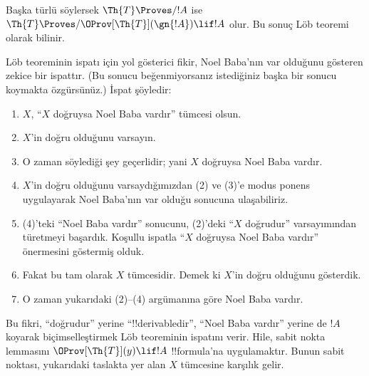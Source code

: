 Başka türlü söylersek $\Th{T} \Proves/ !A$ ise
$\Th{T} \Proves/ \OProv[\Th{T}](\gn{!A}) \lif !A$ olur. Bu sonuç L\"ob
teoremi olarak bilinir.

\begin{explain}
L\"ob teoreminin ispatı için yol gösterici fikir, Noel Baba'nın var olduğunu
gösteren zekice bir ispattır. (Bu sonucu beğenmiyorsanız istediğiniz başka bir
sonucu koymakta özgürsünüz.) İspat şöyledir:
\begin{enumerate}
\item $X$, ``$X$ doğruysa Noel Baba vardır'' tümcesi olsun.
\item $X$'in doğru olduğunu varsayın.
\item O zaman söylediği şey geçerlidir; yani $X$ doğruysa Noel Baba vardır.
\item $X$'in doğru olduğunu varsaydığımızdan (2) ve (3)'e modus ponens
  uygulayarak Noel Baba'nın var olduğu sonucuna ulaşabiliriz.
\item (4)'teki ``Noel Baba vardır'' sonucunu, (2)'deki ``$X$ doğrudur''
  varsayımından türetmeyi başardık. Koşullu ispatla ``$X$ doğruysa Noel Baba
  vardır'' önermesini göstermiş olduk.
\item Fakat bu tam olarak $X$ tümcesidir. Demek ki $X$'in doğru olduğunu
  gösterdik.
\item O zaman yukarıdaki (2)--(4) argümanına göre Noel Baba vardır.
\end{enumerate}
Bu fikri, ``doğrudur'' yerine ``!!{derivable}{}dir'', ``Noel Baba vardır''
yerine de $!A$ koyarak biçimselleştirmek L\"ob teoreminin ispatını verir.
Hile, sabit nokta lemmasını $\OProv[\Th{T}](y) \lif !A$ !!{formula}'na
uygulamaktır. Bunun sabit noktası, yukarıdaki taslakta yer alan $X$ tümcesine
karşılık gelir.
\end{explain}

